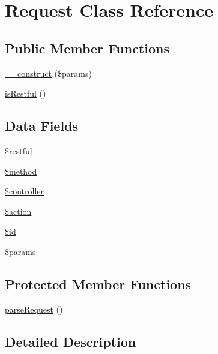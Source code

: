 \hypertarget{class_request}{\section{\-Request \-Class \-Reference}
\label{class_request}
}
\subsection*{\-Public \-Member \-Functions}
\begin{DoxyCompactItemize}
\item 
\hyperlink{class_request_a9162320adff1a1a4afd7f2372f753a3e}{\-\_\-\-\_\-construct} (\$params)
\item 
\hyperlink{class_request_ac90dbead0b4dc5c85a0bbb218cf271de}{is\-Restful} ()
\end{DoxyCompactItemize}
\subsection*{\-Data \-Fields}
\begin{DoxyCompactItemize}
\item 
\hyperlink{class_request_a9e55885b258b0f5bc40d258e52f41741}{\$restful}
\item 
\hyperlink{class_request_a12661b2fc0f57f97e30a1620889ce9c6}{\$method}
\item 
\hyperlink{class_request_a388ef7b1db5e6f728e63cee704ce6e23}{\$controller}
\item 
\hyperlink{class_request_aa698a3e72116e8e778be0e95d908ee30}{\$action}
\item 
\hyperlink{class_request_ae97941710d863131c700f069b109991e}{\$id}
\item 
\hyperlink{class_request_afe68e6fbe7acfbffc0af0c84a1996466}{\$params}
\end{DoxyCompactItemize}
\subsection*{\-Protected \-Member \-Functions}
\begin{DoxyCompactItemize}
\item 
\hyperlink{class_request_ade6cd60890b337f013ea22d935224e64}{parse\-Request} ()
\end{DoxyCompactItemize}


\subsection{\-Detailed \-Description}


